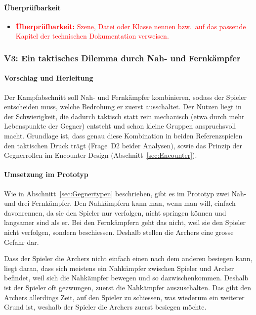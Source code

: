 \documentclass[../Main.tex]{subfiles}
\begin{document}
\paragraph{Überprüfbarkeit}
\begin{itemize}[leftmargin=1.5cm]
    \item \textcolor{red}{\textbf{Überprüfbarkeit:} Szene, Datei oder Klasse nennen bzw.\ auf das passende Kapitel der technischen Dokumentation verweisen.}
\end{itemize}

\subsubsection{V3: Ein taktisches Dilemma durch Nah- und Fernkämpfer} \label{sec:V3}

\paragraph{Vorschlag und Herleitung}
Der Kampfabschnitt soll Nah- und Fernkämpfer kombinieren, sodass der Spieler entscheiden muss, welche Bedrohung er zuerst ausschaltet. Der Nutzen liegt in der Schwierigkeit, die dadurch taktisch statt rein mechanisch (etwa durch mehr Lebenspunkte der Gegner) entsteht und schon kleine Gruppen anspruchsvoll macht. Grundlage ist, dass genau diese Kombination in beiden Referenzspielen den taktischen Druck trägt (Frage~D2 beider Analysen), sowie das Prinzip der Gegnerrollen im Encounter-Design (Abschnitt~\ref{sec:Encounter}).

\paragraph{Umsetzung im Prototyp}
Wie in Abschnitt~\ref{sec:Gegnertypen} beschrieben, gibt es im Prototyp zwei Nah- und drei Fernkämpfer. Den Nahkämpfern kann man, wenn man will, einfach davonrennen, da sie den Spieler nur verfolgen, nicht springen können und langsamer sind als er. Bei den Fernkämpfern geht das nicht, weil sie den Spieler nicht verfolgen, sondern beschiessen. Deshalb stellen die Archers eine grosse Gefahr dar.

Dass der Spieler die Archers nicht einfach einen nach dem anderen besiegen kann, liegt daran, dass sich meistens ein Nahkämpfer zwischen Spieler und Archer befindet, weil sich die Nahkämpfer bewegen und so dazwischenkommen. Deshalb ist der Spieler oft gezwungen, zuerst die Nahkämpfer auszuschalten. Das gibt den Archers allerdings Zeit, auf den Spieler zu schiessen, was wiederum ein weiterer Grund ist, weshalb der Spieler die Archers zuerst besiegen möchte.
\end{document}
